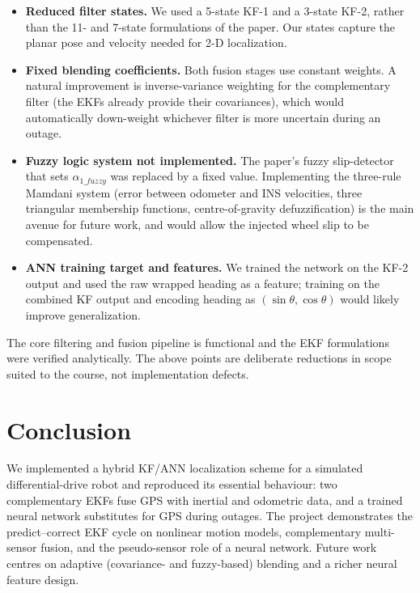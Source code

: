 \documentclass[11pt,a4paper]{article}
\begin{document}
\begin{itemize}[leftmargin=1.6em]
  \item \textbf{Reduced filter states.} We used a 5-state KF-1 and a 3-state KF-2,
        rather than the 11- and 7-state formulations of the paper. Our states capture
        the planar pose and velocity needed for 2-D localization.
  \item \textbf{Fixed blending coefficients.} Both fusion stages use constant weights.
        A natural improvement is inverse-variance weighting for the complementary
        filter (the EKFs already provide their covariances), which would automatically
        down-weight whichever filter is more uncertain during an outage.
  \item \textbf{Fuzzy logic system not implemented.} The paper's fuzzy slip-detector
        that sets $\alpha_{1\_fuzzy}$ was replaced by a fixed value. Implementing the
        three-rule Mamdani system (error between odometer and INS velocities, three
        triangular membership functions, centre-of-gravity defuzzification) is the
        main avenue for future work, and would allow the injected wheel slip to be
        compensated.
  \item \textbf{ANN training target and features.} We trained the network on the KF-2
        output and used the raw wrapped heading as a feature; training on the combined
        KF output and encoding heading as $(\sin\theta,\cos\theta)$ would likely
        improve generalization.
\end{itemize}

The core filtering and fusion pipeline is functional and the EKF formulations were
verified analytically. The above points are deliberate reductions in scope suited to
the course, not implementation defects.

\section{Conclusion}
We implemented a hybrid KF/ANN localization scheme for a simulated differential-drive
robot and reproduced its essential behaviour: two complementary EKFs fuse GPS with
inertial and odometric data, and a trained neural network substitutes for GPS during
outages. The project demonstrates the predict--correct EKF cycle on nonlinear motion
models, complementary multi-sensor fusion, and the pseudo-sensor role of a neural
network. Future work centres on adaptive (covariance- and fuzzy-based) blending and a
richer neural feature design.
\end{document}

